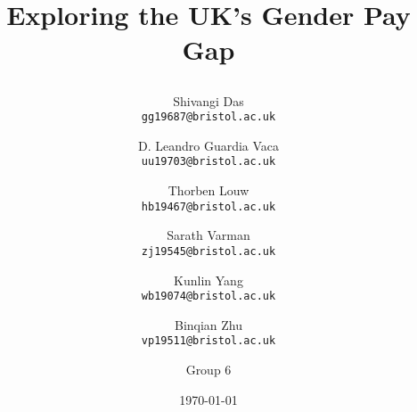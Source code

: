 \documentclass[a4, 11pt]{article}
\title{\vspace{-5em} {\Huge  Exploring the UK's Gender Pay Gap }
\author{
 Shivangi Das\\
 \small{ \texttt{gg19687@bristol.ac.uk}}
  \and
 D. Leandro Guardia Vaca\\
  \small{\texttt{uu19703@bristol.ac.uk}}
 \and
 Thorben Louw\\
\small{\texttt{hb19467@bristol.ac.uk}}
  \and
 Sarath Varman\\
 \small{ \texttt{zj19545@bristol.ac.uk}}
 \and
 Kunlin Yang\\
  \small{\texttt{wb19074@bristol.ac.uk}}
 \and
 Binqian Zhu\\
  \small{\texttt{vp19511@bristol.ac.uk}}
 \and Group 6
}}
\date{\today}
\begin{document}
    
        \maketitle
        
    

    \thispagestyle{fancy}
  \begin{multicols}{2}

       
    
    
    
    

\renewcommand*{\bibfont}{\footnotesize}
\printbibliography
\end{multicols}

\begin{appendices}
    
\end{appendices}
\end{document}
